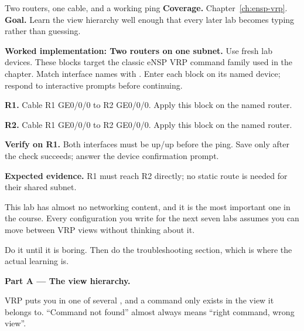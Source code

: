 
\begin{labproject}{Two routers, one cable, and a working ping}
\textbf{Coverage.} Chapter~\ref{ch:ensp-vrp}.\\
\textbf{Goal.} Learn the view hierarchy well enough that every later lab becomes typing rather than guessing.



\noindent\textbf{Worked implementation: Two routers on one subnet.}
Use fresh lab devices. These blocks target the classic eNSP VRP command family used in the chapter. Match interface names with . Enter each block on its named device; respond to interactive prompts before continuing.

\noindent\textbf{R1.} Cable R1 GE0/0/0 to R2 GE0/0/0. Apply this block on the named router.


\noindent\textbf{R2.} Cable R1 GE0/0/0 to R2 GE0/0/0. Apply this block on the named router.


\noindent\textbf{Verify on R1.} Both interfaces must be up/up before the ping. Save only after the check succeeds; answer the device confirmation prompt.


\textbf{Expected evidence.} R1 must reach R2 directly; no static route is needed for their shared subnet.




\begin{labmode}
This lab has almost no networking content, and it is the most important one in the course. Every configuration you write for the next seven labs assumes you can move between VRP views without thinking about it.

Do it until it is boring. Then do the troubleshooting section, which is where the actual learning is.
\end{labmode}

\medskip\noindent\textbf{Part A --- The view hierarchy.}\par
VRP puts you in one of several , and a command only exists in the view it belongs to. ``Command not found'' almost always means ``right command, wrong view''.





\end{labproject}
